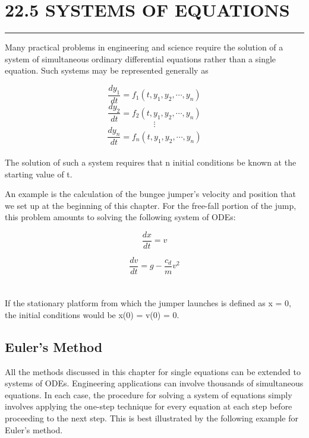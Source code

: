 \documentclass[../main.tex]{subfiles}
\begin{document}
\vspace{0,6in}
\section{22.5 SYSTEMS OF EQUATIONS}
\vspace{0,1in}
\hrule
\vspace{0,1in}

Many practical problems in engineering and science require the solution of a system of simultaneous ordinary differential equations rather than a single equation. Such systems may
be represented generally as

$$\dfrac{dy_1}{dt} = f_1(t,y_1,y_2, \cdots , y_n)$$
\begin{equation}
\tag{22.46}
\dfrac{dy_2}{dt} = f_2(t,y_1,y_2, \cdots, y_n)
\end{equation}
$$\vdots$$
$$\dfrac{dy_n}{dt} = f_n(t,y_1,y_2, \cdots , y_n)$$\\
The solution of such a system requires that n initial conditions be known at the starting
value of t.

An example is the calculation of the bungee jumper's velocity and position that we set
up at the beginning of this chapter. For the free-fall portion of the jump, this problem
amounts to solving the following system of ODEs:

\begin{equation}
\tag{22.47}
\dfrac{dx}{dt} = v
\end{equation}

\begin{equation}
\tag{22.48}
\dfrac{dv}{dt} = g - \dfrac{c_{d}}{m}v^2
\end{equation}\\
\\
If the stationary platform from which the jumper launches is defined as x = 0, the initial
conditions would be x(0) = v(0) = 0.

\subsection{ Euler's Method}

All the methods discussed in this chapter for single equations can be extended to systems
of ODEs. Engineering applications can involve thousands of simultaneous equations. In
each case, the procedure for solving a system of equations simply involves applying the
one-step technique for every equation at each step before proceeding to the next step. This
is best illustrated by the following example for Euler's method.
\end{document}
